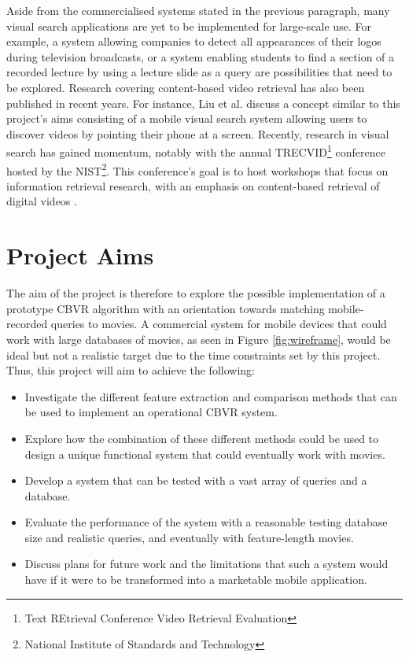 Aside from the commercialised systems stated in the previous paragraph, many visual search applications are yet to be implemented for large-scale use. For example, a system allowing companies to detect all appearances of their logos during television broadcasts, or a system enabling students to find a section of a recorded lecture by using a lecture slide as a query \cite{araujo2017i2v} are possibilities that need to be explored. Research covering content-based video retrieval has also been published in recent years. For instance, Liu et al. \cite{liu2014mobilevideosearch} discuss a concept similar to this project's aims consisting of a mobile visual search system allowing users to discover videos by pointing their phone at a screen. Recently, research in visual search has gained momentum, notably with the annual TRECVID\footnote{Text REtrieval Conference Video Retrieval Evaluation} conference \cite{2018trecvidawad} hosted by the NIST\footnote{National Institute of Standards and Technology}. This conference's goal is to host workshops that focus on information retrieval research, with an emphasis on content-based retrieval of digital videos \cite{trecvid-general}.


\section{Project Aims}
\label{sec:introduction-project-aims}

The aim of the project is therefore to explore the possible implementation of a prototype CBVR algorithm with an orientation towards matching mobile-recorded queries to movies. A commercial system for mobile devices that could work with large databases of movies, as seen in Figure \ref{fig:wireframe}, would be ideal but not a realistic target due to the time constraints set by this project. Thus, this project will aim to achieve the following:

\begin{itemize}
    \item Investigate the different feature extraction and comparison methods that can be used to implement an operational CBVR system.
    \item Explore how the combination of these different methods could be used to design a unique functional system that could eventually work with movies.
    \item Develop a system that can be tested with a vast array of queries and a database.
    \item Evaluate the performance of the system with a reasonable testing database size and realistic queries, and eventually with feature-length movies.
    \item Discuss plans for future work and the limitations that such a system would have if it were to be transformed into a marketable mobile application.
\end{itemize}

